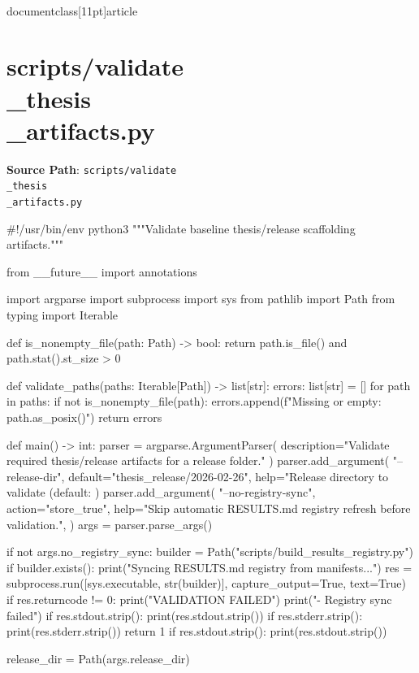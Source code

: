 \\documentclass[11pt]{article}
\begin{document}
\section*{scripts/validate\\_thesis\\_artifacts.py}
\textbf{Source Path}: \texttt{scripts/validate\\_thesis\\_artifacts.py}\par
\bigskip
\begin{CodeBlock}
#!/usr/bin/env python3
"""Validate baseline thesis/release scaffolding artifacts."""

from __future__ import annotations

import argparse
import subprocess
import sys
from pathlib import Path
from typing import Iterable


def is_nonempty_file(path: Path) -> bool:
    return path.is_file() and path.stat().st_size > 0


def validate_paths(paths: Iterable[Path]) -> list[str]:
    errors: list[str] = []
    for path in paths:
        if not is_nonempty_file(path):
            errors.append(f"Missing or empty: {path.as_posix()}")
    return errors


def main() -> int:
    parser = argparse.ArgumentParser(
        description="Validate required thesis/release artifacts for a release folder."
    )
    parser.add_argument(
        "--release-dir",
        default="thesis_release/2026-02-26",
        help="Release directory to validate (default: %
    )
    parser.add_argument(
        "--no-registry-sync",
        action="store_true",
        help="Skip automatic RESULTS.md registry refresh before validation.",
    )
    args = parser.parse_args()

    if not args.no_registry_sync:
        builder = Path("scripts/build_results_registry.py")
        if builder.exists():
            print("Syncing RESULTS.md registry from manifests...")
            res = subprocess.run([sys.executable, str(builder)], capture_output=True, text=True)
            if res.returncode != 0:
                print("VALIDATION FAILED")
                print("- Registry sync failed")
                if res.stdout.strip():
                    print(res.stdout.strip())
                if res.stderr.strip():
                    print(res.stderr.strip())
                return 1
            if res.stdout.strip():
                print(res.stdout.strip())

    release_dir = Path(args.release_dir)


\end{CodeBlock}
\end{document}
